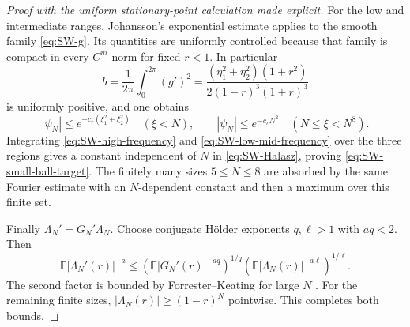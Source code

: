 \begin{proof}[Proof with the uniform stationary-point calculation made explicit]
For the low and intermediate ranges, Johansson's exponential estimate
\cite[proof of Prop.~2.8]{johansson1997} applies to the smooth family \eqref{eq:SW-g}.  Its
quantities are uniformly controlled because that family is compact in every $C^m$ norm for
fixed $r<1$.  In particular
\begin{equation}
 b=\frac1{2\pi}\int_0^{2\pi}(g')^2
 =\frac{(\eta_1^2+\eta_2^2)(1+r^2)}{2(1-r)^3(1+r)^3}
\end{equation}
is uniformly positive, and one obtains
\begin{equation}
 |\psi_N|\leq e^{-c_r(\xi_1^2+\xi_2^2)}\quad(\xi<N),
 \qquad |\psi_N|\leq e^{-c_rN^2}\quad(N\leq\xi<N^8).
 \label{eq:SW-low-mid-frequency}
\end{equation}
Integrating \eqref{eq:SW-high-frequency} and \eqref{eq:SW-low-mid-frequency} over the three
regions gives a constant independent of $N$ in \eqref{eq:SW-Halasz}, proving
\eqref{eq:SW-small-ball-target}.  The finitely many sizes $5\leq N\leq8$ are absorbed by the
same Fourier estimate with an $N$-dependent constant and then a maximum over this finite set.

Finally $\Lambda_N'=G_N'\Lambda_N$.  Choose conjugate H\"older exponents $q,\ell>1$ with
$aq<2$.  Then
\begin{equation}
 \mathbb E|\Lambda_N'(r)|^{-a}
 \leq(\mathbb E|G_N'(r)|^{-aq})^{1/q}
      (\mathbb E|\Lambda_N(r)|^{-a\ell})^{1/\ell}.
\end{equation}
The second factor is bounded by Forrester--Keating for large $N$
\cite[Cor.~2]{forresterKeating2004}.  For the remaining finite sizes,
$|\Lambda_N(r)|\geq(1-r)^N$ pointwise.  This completes both bounds.
\end{proof}


